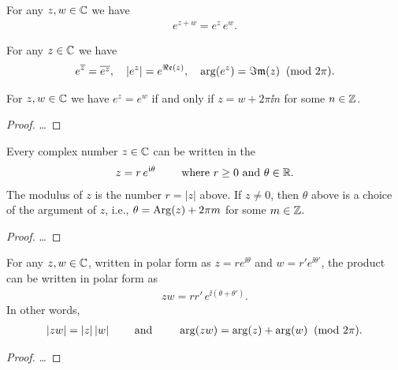 \begin{lemma}
  \label{lem:complex_exp_properties}
  For any $z,w \in \mathbb{C}$ we have
  \begin{align*}
    e^{z + w} = e^z \, e^w.
  \end{align*}

  For any $z \in \mathbb{C}$ we have
  \begin{align*}
    e^{\overline{z}} = \overline{e^z}, \quad |e^z| = e^{\Re\mathfrak{e}(z)}, \quad \arg(e^z) = \Im\mathfrak{m}(z) \;\;(\mathrm{mod}~2\pi) .
  \end{align*}

  For $z,w \in \mathbb{C}$ we have
  $e^{z} = e^{w}$ if and only if $z = w + 2 \pi \ii n$ for some $n \in \mathbb{Z}$.
\end{lemma}
\begin{proof}
  \ldots
\end{proof}

\begin{lemma}
  \label{lem:polar_form}
  Every complex number $z \in \mathbb{C}$ can be written in the 
  \begin{align*}
    z = r \, e^{\mathfrak{i} \theta}
    \qquad \text{ where $r \ge 0$ and $\theta \in \mathbb{R}$.}
  \end{align*}
  The modulus of $z$ is the number $r = |z|$ above.
  If $z \ne 0$, then $\theta$ above is a choice of the argument of $z$,
  i.e., $\theta = \mathrm{Arg}(z) + 2 \pi m$ for some $m \in \mathbb{Z}$.
\end{lemma}
\begin{proof}
  \ldots
\end{proof}

\begin{lemma}
  \label{lem:multiplication_polar}
  For any $z,w \in \mathbb{C}$, written in polar form as
  $z = r e^{\ii \theta}$ and $w = r' e^{\ii \theta'}$, the product
  can be written in polar form as
  \begin{align*}
    z w = r r' \, e^{\ii (\theta + \theta')} .
  \end{align*}
  In other words,
  \begin{align*}
    |z w| = |z| \, |w|
    \qquad \text{ and } \qquad
    \arg(z w) = \arg(z) + \arg(w) \;\;(\mathrm{mod}~2\pi).
  \end{align*}
\end{lemma}
\begin{proof}
  \ldots
\end{proof}

